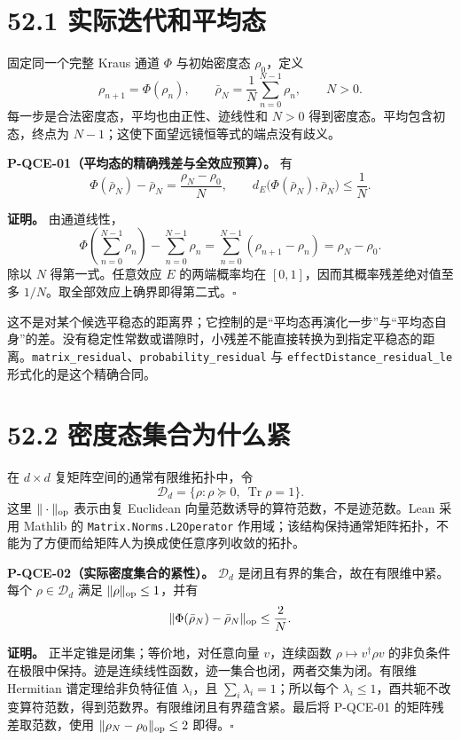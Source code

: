 \documentclass[
  11pt,
  oneside]{book}
\begin{document}
\section{52.1 实际迭代和平均态}

固定同一个完整 Kraus 通道 \(\Phi\) 与初始密度态 \(\rho_0\)，定义 \[
\rho_{n+1}=\Phi(\rho_n),\qquad
\bar\rho_N=\frac1N\sum_{n=0}^{N-1}\rho_n,\qquad N>0.
\] 每一步是合法密度态，平均也由正性、迹线性和 \(N>0\)
得到密度态。平均包含初态，终点为
\(N-1\)；这使下面望远镜恒等式的端点没有歧义。

\protect\hypertarget{p-qce-01}{}{}

\textbf{P-QCE-01（平均态的精确残差与全效应预算）。} 有 \[
\Phi(\bar\rho_N)-\bar\rho_N=\frac{\rho_N-\rho_0}{N},
\qquad
d_E\bigl(\Phi(\bar\rho_N),\bar\rho_N\bigr)\le\frac1N.
\]

\textbf{证明。} 由通道线性， \[
\Phi\left(\sum_{n=0}^{N-1}\rho_n\right)-\sum_{n=0}^{N-1}\rho_n
=\sum_{n=0}^{N-1}(\rho_{n+1}-\rho_n)=\rho_N-\rho_0.
\] 除以 \(N\) 得第一式。任意效应 \(E\) 的两端概率均在
\([0,1]\)，因而其概率残差绝对值至多
\(1/N\)。取全部效应上确界即得第二式。\(\square\)

这不是对某个候选平稳态的距离界；它控制的是``平均态再演化一步''与``平均态自身''的差。没有稳定性常数或谱隙时，小残差不能直接转换为到指定平稳态的距离。\texttt{matrix\_\allowbreak residual}、\allowbreak \texttt{probability\_\allowbreak residual}
与 \texttt{effect\allowbreak Distance\_\allowbreak residual\_\allowbreak le} 形式化的是这个精确合同。

\section{52.2 密度态集合为什么紧}

在 \(d\times d\) 复矩阵空间的通常有限维拓扑中，令 \[
\mathcal D_d=\{\rho:\rho\succeq0,\ \operatorname{Tr}\rho=1\}.
\] 这里 \(\|\cdot\|_{\rm op}\) 表示由复 Euclidean
向量范数诱导的算符范数，不是迹范数。Lean 采用 Mathlib 的
\texttt{Matrix.\allowbreak Norms.\allowbreak L2\allowbreak Operator}
作用域；该结构保持通常矩阵拓扑，不能为了方便而给矩阵人为换成使任意序列收敛的拓扑。

\protect\hypertarget{p-qce-02}{}{}

\textbf{P-QCE-02（实际密度集合的紧性）。} \(\mathcal D_d\)
是闭且有界的集合，故在有限维中紧。每个 \(\rho\in\mathcal D_d\) 满足
\(\|\rho\|_{\rm op}\le1\)，并有 \[
\|\Phi(\bar\rho_N)-\bar\rho_N\|_{\rm op}\le\frac2N.
\]

\textbf{证明。} 正半定锥是闭集；等价地，对任意向量 \(v\)，连续函数
\(\rho\mapsto v^\dagger\rho v\)
的非负条件在极限中保持。迹是连续线性函数，迹一集合也闭，两者交集为闭。有限维
Hermitian 谱定理给非负特征值 \(\lambda_i\)，且
\(\sum_i\lambda_i=1\)；所以每个
\(\lambda_i\le1\)，酉共轭不改变算符范数，得到范数界。有限维闭且有界蕴含紧。最后将
P-QCE-01 的矩阵残差取范数，使用 \(\|\rho_N-\rho_0\|_{\rm op}\le2\)
即得。\(\square\)
\end{document}
